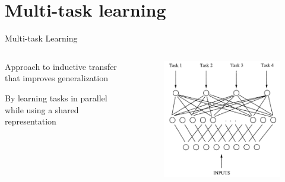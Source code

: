 \documentclass[12pt]{beamer}
\begin{document}
\section{Multi-task learning}


\begin{frame}{Multi-task Learning}

\begin{columns}
\begin{column}{0.5\linewidth}
Approach to inductive transfer that improves generalization

\bigskip	

By learning tasks in parallel while using a shared representation
	
\end{column}
\begin{column}{0.5\linewidth}
\begin{figure}
	\includegraphics[width=\linewidth]{img/multitask.png}	
\end{figure}
	
\end{column}
\end{columns}
	
\bigskip

\begin{footnotesize}
\end{footnotesize}
	
	
\end{frame}
\end{document}
